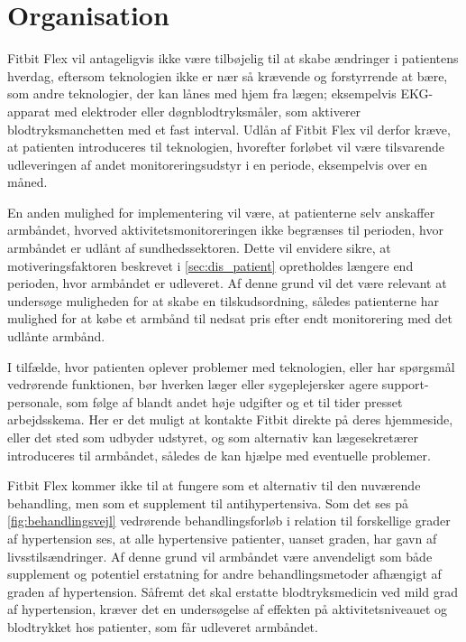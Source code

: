 \section{Organisation} \label{sec:dis_organisation}

Fitbit Flex vil antageligvis ikke være tilbøjelig til at skabe ændringer i patientens hverdag, eftersom teknologien ikke er nær så krævende og forstyrrende at bære, som andre teknologier, der kan lånes med hjem fra lægen; eksempelvis EKG-apparat med elektroder eller døgnblodtryksmåler, som aktiverer blodtryksmanchetten med et fast interval. Udlån af Fitbit Flex vil derfor kræve, at patienten introduceres til teknologien, hvorefter forløbet vil være tilsvarende udleveringen af andet monitoreringsudstyr i en periode, eksempelvis over en måned.

En anden mulighed for implementering vil være, at patienterne selv anskaffer armbåndet, hvorved aktivitetsmonitoreringen ikke begrænses til perioden, hvor armbåndet er udlånt af sundhedssektoren. Dette vil envidere sikre, at motiveringsfaktoren beskrevet i \autoref{sec:dis_patient} opretholdes længere end perioden, hvor armbåndet er udleveret. Af denne grund vil det være relevant at undersøge muligheden for at skabe en tilskudsordning, således patienterne har mulighed for at købe et armbånd til nedsat pris efter endt monitorering med det udlånte armbånd.

I tilfælde, hvor patienten oplever problemer med teknologien, eller har spørgsmål vedrørende funktionen, bør hverken læger eller sygeplejersker agere support-personale, som følge af blandt andet høje udgifter og et til tider presset arbejdsskema. Her er det muligt at kontakte Fitbit direkte på deres hjemmeside, eller det sted som udbyder udstyret, og som alternativ kan lægesekretærer introduceres til armbåndet, således de kan hjælpe med eventuelle problemer.

Fitbit Flex kommer ikke til at fungere som et alternativ til den nuværende behandling, men som et supplement til antihypertensiva. Som det ses på \autoref{fig:behandlingsvejl} vedrørende behandlingsforløb i relation til forskellige grader af hypertension ses, at alle hypertensive patienter, uanset graden, har gavn af livsstilsændringer. Af denne grund vil armbåndet være anvendeligt som både supplement og potentiel erstatning for andre behandlingsmetoder afhængigt af graden af hypertension. Såfremt det skal erstatte blodtryksmedicin ved mild grad af hypertension, kræver det en undersøgelse af effekten på aktivitetsniveauet og blodtrykket hos patienter, som får udleveret armbåndet.


